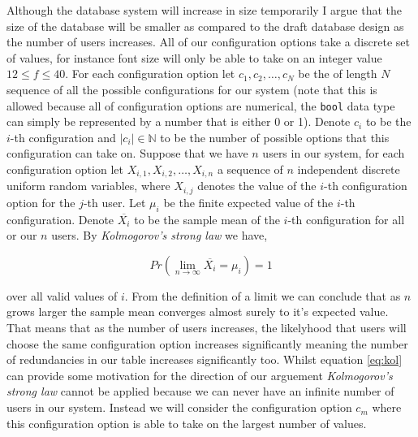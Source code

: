 Although the
database system will increase in size temporarily I argue that
the size of the database will be smaller as compared to the 
draft database design as the number of users increases. All of
our configuration options take a discrete set of values, for 
instance font size will only be able to take on an integer
value $12 \leq f \leq 40$. For each configuration option let
$c_1, c_2, \ldots, c_N$ be the of length $N$ sequence of all
the possible configurations for our 
system (note that this is allowed because all of configuration
options are numerical, the \texttt{bool} data type can simply
be represented by a number that is either 0 or 1). Denote
$c_i$ to be the $i$-th configuration and $|c_i| \in \mathbb{N}$
to be the number of possible options that this configuration 
can take on. Suppose that we have $n$ users in our system,
for each configuration option let
$X_{i, 1}, X_{i, 2}, \ldots, X_{i, n}$ a sequence of $n$
independent discrete uniform random variables, 
where $X_{i, j}$ denotes the value of the $i$-th configuration
option for the $j$-th user. Let $\mu_i$ be the finite expected
value of the $i$-th configuration. Denote $\overline{X_i}$ to 
be the sample mean of the $i$-th configuration for all or our
$n$ users. By \textit{Kolmogorov's strong law} \cite{thm}
we have,

\begin{equation} \label{eq:kol}
  Pr \left(\lim_{n \to \infty} \overline{X_i} = \mu_i \right) = 1
\end{equation}

over all valid values of $i$. From the definition of a limit
we can conclude that as $n$ grows larger the sample mean 
converges almost surely to it's expected value. That means
that as the number of users increases, the likelyhood that 
users will choose the same configuration option increases 
significantly meaning the number of redundancies in our table 
increases significantly too. Whilst
equation \ref{eq:kol} can provide some motivation for the 
direction of our arguement \textit{Kolmogorov's strong law}
cannot be applied because we can never have an infinite number
of users in our system. Instead we will consider the
configuration option $c_m$ where this configuration option is
able to take on the largest number of values.\\ \vspace{0.2cm}


